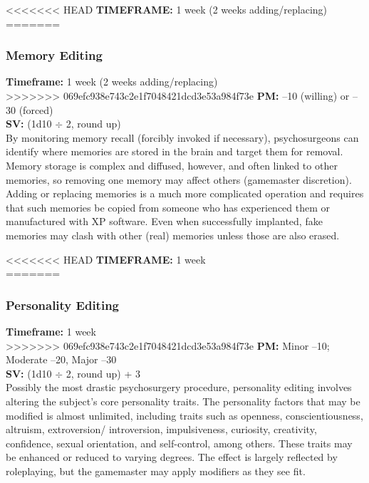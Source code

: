 <<<<<<< HEAD  \textbf{TIMEFRAME:} 1 week (2 weeks adding/replacing) \\ ======= \subsubsection{Memory Editing} \textbf{Timeframe:} 1 week (2 weeks adding/replacing) \\ >>>>>>> 069efc938e743c2e1f7048421dcd3e53a984f73e \textbf{PM:} –10 (willing) or –30 (forced) \\ \textbf{SV:} (1d10 $\div$ 2, round up) \\ By monitoring memory recall (forcibly invoked if necessary), psychosurgeons can identify where memories are stored in the brain and target them for removal. Memory storage is complex and diffused, however, and often linked to other memories, so removing one memory may affect others (gamemaster discretion). Adding or replacing memories is a much more complicated operation and requires that such memories be copied from someone who has experienced them or manufactured with XP software. Even when successfully implanted, fake memories may clash with other (real) memories unless those are also erased. 

<<<<<<< HEAD  \textbf{TIMEFRAME:} 1 week \\ ======= \subsubsection{Personality Editing} \textbf{Timeframe:} 1 week \\ >>>>>>> 069efc938e743c2e1f7048421dcd3e53a984f73e \textbf{PM:} Minor –10; Moderate –20, Major –30 \\ \textbf{SV:} (1d10 $\div$ 2, round up) + 3 \\ Possibly the most drastic psychosurgery procedure, personality editing involves altering the subject’s core personality traits. The personality factors that may be modified is almost unlimited, including traits such as openness, conscientiousness, altruism, extroversion/ introversion, impulsiveness, curiosity, creativity, confidence, sexual orientation, and self-control, among others. These traits may be enhanced or reduced to varying degrees. The effect is largely reflected by roleplaying, but the gamemaster may apply modifiers as they see fit. 

